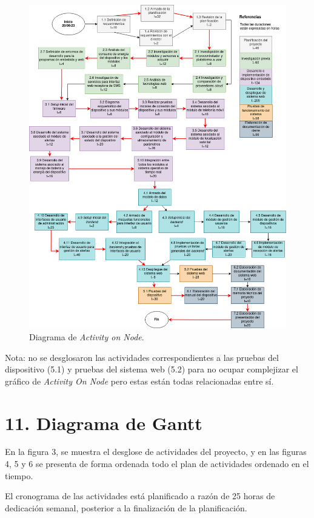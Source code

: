 \documentclass[
11pt, %
]{charter}
\begin{document}
\begin{figure}[htpb]
\centering 
\includegraphics[width=.9\textwidth]{./Figuras/AoN.png}
\caption{Diagrama de \textit{Activity on Node}.}
\label{fig:AoN}
\end{figure}

Nota: no se desglosaron las actividades correspondientes a las pruebas del dispositivo (5.1) y pruebas del sistema web (5.2) para no ocupar complejizar el gráfico de \textit{Activity On Node} pero estas están todas relacionadas entre sí.

\section{11. Diagrama de Gantt}
\label{sec:gantt}

En la figura 3, se muestra el desglose de actividades del proyecto, y en las figuras 4, 5 y 6 se presenta de forma ordenada todo el plan de actividades ordenado en el tiempo.

El cronograma de las actividades está planificado a razón de 25 horas de dedicación semanal, posterior a la finalización de la planificación.
 
\end{document}

